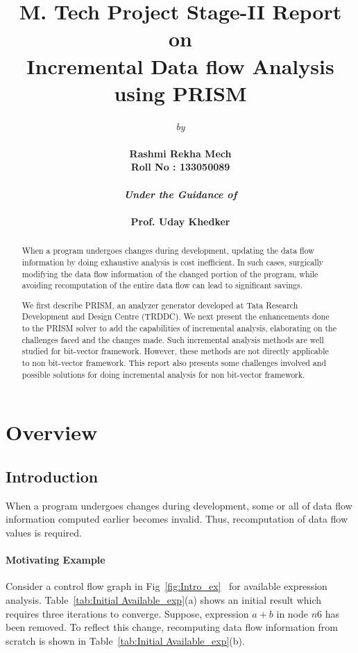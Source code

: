 \documentclass[11pt,a4paper,openright]{report}
\title{\textbf{M. Tech Project Stage-II Report}\\ on \\\textbf{Incremental Data flow Analysis using PRISM}}
\author{\emph{by}\\ \\ \bf{Rashmi Rekha Mech}\\\bf{Roll No : 133050089} \\
\\ \emph{Under the Guidance of}\\ \\\textbf{Prof. Uday Khedker}\\}
\date{}
\begin{document}
\maketitle
\begin{abstract}

When a program undergoes changes during development, updating the
data flow information by doing exhaustive analysis is cost inefficient. In such cases,
surgically modifying the data flow information of the changed portion of the program, while avoiding recomputation of the entire 
data flow can lead to significant savings.

We first describe PRISM, an analyzer generator developed at Tata Research Development and Design Centre (TRDDC).
We next present the enhancements done to the PRISM solver to add the capabilities of incremental analysis, elaborating on the challenges faced and the changes made. 
Such incremental analysis methods are well studied for bit-vector framework. 
However, these methods are not directly applicable to non bit-vector framework. 
This report also presents some challenges involved and possible solutions for doing incremental analysis for non bit-vector framework.

\end{abstract}

\tableofcontents

\listoftables

\listoffigures

\cleardoublepage
\setcounter{page}{1}
\chapter{Overview}
\section{Introduction}
When a program undergoes changes during development, some or all of data flow information computed earlier becomes invalid.
Thus, recomputation of data flow values is required.
\subsubsection{Motivating Example}

Consider a control flow graph in Fig~\ref{fig:Intro_ex}~\cite{thesis_r} for available expression analysis. Table~\ref{tab:Initial Available_exp}(a) shows 
an initial result which requires three iterations to converge. Suppose, expression $a+b$ in node $n6$ has been removed. To reflect this change, recomputing
data flow information from scratch is shown in Table~\ref{tab:Initial Available_exp}(b). 
\end{document}
